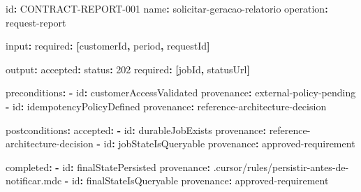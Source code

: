 \documentclass[
  10pt,
  a4paper,
  oneside]{book}
\newenvironment{Shaded}{}{}
\newcommand{\AttributeTok}[1]{\textcolor[rgb]{0.49,0.56,0.16}{#1}}
\newcommand{\DecValTok}[1]{\textcolor[rgb]{0.25,0.63,0.44}{#1}}
\newcommand{\FunctionTok}[1]{\textcolor[rgb]{0.02,0.16,0.49}{#1}}
\newcommand{\KeywordTok}[1]{\textcolor[rgb]{0.00,0.44,0.13}{\textbf{#1}}}
\renewenvironment{Shaded}{\begin{snugshade}}{\end{snugshade}}%
\begin{document}
\begin{Shaded}
\begin{Highlighting}[]
\FunctionTok{id}\KeywordTok{:}\AttributeTok{ CONTRACT{-}REPORT{-}001}
\FunctionTok{name}\KeywordTok{:}\AttributeTok{ solicitar{-}geracao{-}relatorio}
\FunctionTok{operation}\KeywordTok{:}\AttributeTok{ request{-}report}

\FunctionTok{input}\KeywordTok{:}
\AttributeTok{  }\FunctionTok{required}\KeywordTok{:}\AttributeTok{ }\KeywordTok{[}\AttributeTok{customerId}\KeywordTok{,}\AttributeTok{ period}\KeywordTok{,}\AttributeTok{ requestId}\KeywordTok{]}

\FunctionTok{output}\KeywordTok{:}
\AttributeTok{  }\FunctionTok{accepted}\KeywordTok{:}
\AttributeTok{    }\FunctionTok{status}\KeywordTok{:}\AttributeTok{ }\DecValTok{202}
\AttributeTok{    }\FunctionTok{required}\KeywordTok{:}\AttributeTok{ }\KeywordTok{[}\AttributeTok{jobId}\KeywordTok{,}\AttributeTok{ statusUrl}\KeywordTok{]}

\FunctionTok{preconditions}\KeywordTok{:}
\AttributeTok{  }\KeywordTok{{-}}\AttributeTok{ }\FunctionTok{id}\KeywordTok{:}\AttributeTok{ customerAccessValidated}
\AttributeTok{    }\FunctionTok{provenance}\KeywordTok{:}\AttributeTok{ external{-}policy{-}pending}
\AttributeTok{  }\KeywordTok{{-}}\AttributeTok{ }\FunctionTok{id}\KeywordTok{:}\AttributeTok{ idempotencyPolicyDefined}
\AttributeTok{    }\FunctionTok{provenance}\KeywordTok{:}\AttributeTok{ reference{-}architecture{-}decision}

\FunctionTok{postconditions}\KeywordTok{:}
\AttributeTok{  }\FunctionTok{accepted}\KeywordTok{:}
\AttributeTok{    }\KeywordTok{{-}}\AttributeTok{ }\FunctionTok{id}\KeywordTok{:}\AttributeTok{ durableJobExists}
\AttributeTok{      }\FunctionTok{provenance}\KeywordTok{:}\AttributeTok{ reference{-}architecture{-}decision}
\AttributeTok{    }\KeywordTok{{-}}\AttributeTok{ }\FunctionTok{id}\KeywordTok{:}\AttributeTok{ jobStateIsQueryable}
\AttributeTok{      }\FunctionTok{provenance}\KeywordTok{:}\AttributeTok{ approved{-}requirement}

\AttributeTok{  }\FunctionTok{completed}\KeywordTok{:}
\AttributeTok{    }\KeywordTok{{-}}\AttributeTok{ }\FunctionTok{id}\KeywordTok{:}\AttributeTok{ finalStatePersisted}
\AttributeTok{      }\FunctionTok{provenance}\KeywordTok{:}\AttributeTok{ .cursor/rules/persistir{-}antes{-}de{-}notificar.mdc}
\AttributeTok{    }\KeywordTok{{-}}\AttributeTok{ }\FunctionTok{id}\KeywordTok{:}\AttributeTok{ finalStateIsQueryable}
\AttributeTok{      }\FunctionTok{provenance}\KeywordTok{:}\AttributeTok{ approved{-}requirement}


\end{Highlighting}
\end{Shaded}
\end{document}
